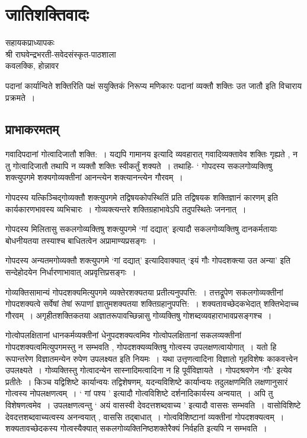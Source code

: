 {\fontsize{15}{17}\selectfont
\chapter{जातिशक्तिवादः}


\begin{center}
\smallskip

सहायकप्राध्यापकः\\
श्री राघवेन्द्रभरती-सवेदसंस्कृत-पाठशाला\\
कवलक्कि, होन्नावर
\addrule
\end{center}

पदानां कार्यान्विते शक्तिरिति पक्षं सयुक्तिकं निरूप्य मणिकारः पदानां व्यक्तौ शक्तिः उत जातौ इति विचाराय प्रक्रमते~। 

\section*{प्राभाकरमतम्}

गवादिपदानां गोत्वादिजातौ शक्ति:~। यद्यपि गामानय इत्यादि व्यवहारात् गवादिव्यक्तावेव शक्तिः गृह्यते , न तु गोत्वादिजातौ तथापि न व्यक्तौ शक्तिः स्वीकर्तुं शक्यते~। तथाहि- ‘ गोपदस्य सकलगोव्यक्तिषु शक्त्युपगमे शक्यगोव्यक्तीनां आनन्त्येन शक्त्यानन्त्येन गौरवम्~। 

गोपदस्य यत्किञ्चिद्गोव्यक्तौ शक्त्युपगमे तद्विषयकोपस्थितिं प्रति तद्विषयक शक्तिज्ञानं कारणम् इति कार्यकारणभावस्य व्यभिचारः~। गोव्यक्त्यन्तरे शक्तिग्रहाभावेऽपि तदुपस्थितेः जननात्~। 

गोपदस्य मिलितासु सकलगोव्यक्तिषु शक्त्युपगमे ‘गां दद्यात्’ इत्यादौ सकलगोव्यक्तिषु दानकर्मतायाः बोधनीयतया तस्याश्च बाधितत्वेन अप्रामाण्यप्रसङ्गः~। 

गोपदस्य अन्यतमगोव्यक्तौ शक्त्युपगमे ‘गां दद्यात्’ इत्यादिवाक्यात् ‘इयं गौः गोपदशक्त्या उत अन्या’ इति सन्देहोदयेन निर्धारणाभावात् अप्रवृत्तिप्रसङ्गः~। 

गोव्यक्तिसामान्यं गोपदशक्यमित्युपगमे व्यक्तेरशक्यतया प्रतीत्यनुपपत्ति:~। तत्तद्रूपेण सकलगोव्यक्तीनां गोपदशक्यत्वे सर्वेषां तेषां रूपाणां ज्ञातुमशक्यतया शक्तिग्रहानुपपत्ति:~। शक्यतावच्छेदकभेदात् शक्तिभेदाच्च गौरवम्~। अगृहीतशक्तिकतया अज्ञातरूपावच्छिन्नासु गोव्यक्तिषु गोशब्दव्यवहाराभावप्रसङ्गश्च~। 

गोत्वोपलक्षितानां धानकर्मव्यक्तीनां धेनुपदशक्यत्वमिव गोत्वोपलक्षितानां सकलव्यक्तीनां गोपदशक्यत्वमित्युपगमस्तु न सम्भवति , गोपदशक्यव्यक्तिषु गोत्वस्य उपलक्षणत्वायोगात्~। यतो हि रूपान्तरेण विज्ञातमन्येन रुपेण उपलक्ष्यत इति नियमः~। यथा उत्तृणत्वादिना विज्ञातो गृहविशेषः काकवत्त्वेन उपलक्ष्यते~। गोव्यक्तिस्तु गोत्वादन्येन सास्नादिमत्वादिना न हि पूर्वंविज्ञायते~। गोपदश्रवणेन ‘गौः’ इत्येव प्रतीतेः~। किञ्च यद्विशिष्टे कार्यान्वयः तद्विशेषणम्, यदन्यविशिष्टे कार्यान्वयः तदुलक्षणमिति लक्षणानुसारं गोत्वस्य नोपलक्षणत्वम्~। ‘ गां पश्य ’ इत्यादौ गोत्वविशिष्टे दर्शनादिकार्यस्य अन्वयात्~। अपि तु विशेषणत्वमेव~। उपलक्षणत्वन्तु ‘ अयं वासस्वी देवदत्तशब्दवाच्य ’ इत्यादौ वाससः सम्भवति~। वासोविशिष्टे देवदत्तशब्दवाच्यत्वस्य अनन्वयात् , वाससि तद्बाधात्~। गोत्वविशिष्टानां व्यक्तीनां गोपदशक्यत्वम्~। शक्यतावच्छेदकस्य गोत्वस्यैक्यात् सकलगोव्यक्तिनिष्ठशक्तेरैक्यं निर्वहति इत्यपि न सम्भवति~। 

}
